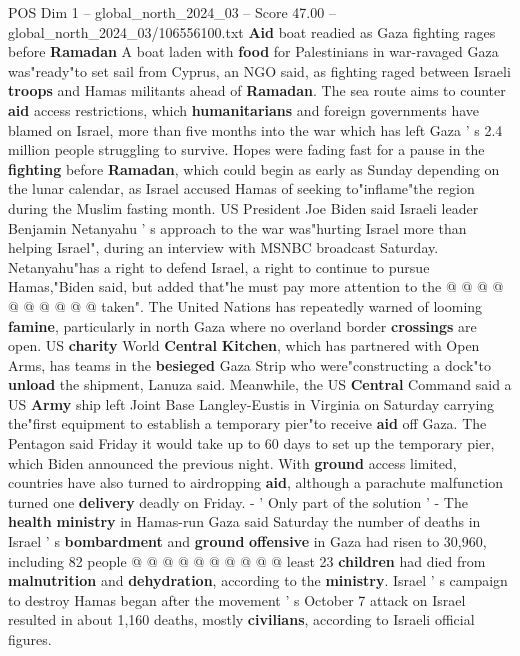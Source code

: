\begin{textsample}{POS Dim 1 – global\_north\_2024\_03 – Score 47.00 – global\_north\_2024\_03/106556100.txt}  \label{ex:f1_pos_059}
\textbf{Aid} boat readied as Gaza fighting rages before \textbf{Ramadan} A boat laden with \textbf{food} for Palestinians in war-ravaged Gaza was"ready"to set sail from Cyprus, an NGO said, as fighting raged between Israeli \textbf{troops} and Hamas militants ahead of \textbf{Ramadan}.
The sea route aims to counter \textbf{aid} access restrictions, which \textbf{humanitarians} and foreign governments have blamed on Israel, more than five months into the war which has left Gaza ' s 2.4 million people struggling to survive.
Hopes were fading fast for a pause in the \textbf{fighting} before \textbf{Ramadan}, which could begin as early as Sunday depending on the lunar calendar, as Israel accused Hamas of seeking to"inflame"the region during the Muslim fasting month.
US President Joe Biden said Israeli leader Benjamin Netanyahu ' s approach to the war was"hurting Israel more than helping Israel", during an interview with MSNBC broadcast Saturday.
Netanyahu"has a right to defend Israel, a right to continue to pursue Hamas,"Biden said, but added that"he must pay more attention to the @ @ @ @ @ @ @ @ @ @ taken".
The United Nations has repeatedly warned of looming \textbf{famine}, particularly in north Gaza where no overland border \textbf{crossings} are open.
US \textbf{charity} World \textbf{Central} \textbf{Kitchen}, which has partnered with Open Arms, has teams in the \textbf{besieged} Gaza Strip who were"constructing a dock"to \textbf{unload} the shipment, Lanuza said.
Meanwhile, the US \textbf{Central} Command said a US \textbf{Army} ship left Joint Base Langley-Eustis in Virginia on Saturday carrying the"first equipment to establish a temporary pier"to receive \textbf{aid} off Gaza.
The Pentagon said Friday it would take up to 60 days to set up the temporary pier, which Biden announced the previous night.
With \textbf{ground} access limited, countries have also turned to airdropping \textbf{aid}, although a parachute malfunction turned one \textbf{delivery} deadly on Friday. - ' Only part of the solution ' - The \textbf{health} \textbf{ministry} in Hamas-run Gaza said Saturday the number of deaths in Israel ' s \textbf{bombardment} and \textbf{ground} \textbf{offensive} in Gaza had risen to 30,960, including 82 people @ @ @ @ @ @ @ @ @ @ least 23 \textbf{children} had died from \textbf{malnutrition} and \textbf{dehydration}, according to the \textbf{ministry}.
Israel ' s campaign to destroy Hamas began after the movement ' s October 7 attack on Israel resulted in about 1,160 deaths, mostly \textbf{civilians}, according to Israeli official figures.

\end{textsample}
